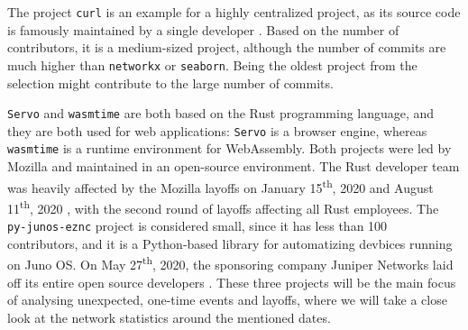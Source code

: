The project \texttt{curl} is an example for a highly centralized project, as its source code is famously maintained by a single developer \cite{crowstonHierarchyCentralizationFree2006}. Based on the number of contributors, it is a medium-sized project, although the number of commits are much higher than \texttt{networkx} or \texttt{seaborn}. Being the oldest project from the selection might contribute to the large number of commits.

\begin{table}
    \centering
        \caption{Collaboration analysis projects and basic statistics.}
        \label{tab:projects}
\end{table}

\texttt{Servo} and \texttt{wasmtime} are both based on the Rust programming language, and they are both used for web applications: \texttt{Servo} is a browser engine, whereas \texttt{wasmtime} is a runtime environment for WebAssembly. Both projects were led by Mozilla and maintained in an open-source environment. The Rust developer team was heavily affected by the Mozilla layoffs on January 15\textsuperscript{th}, 2020 and August 11\textsuperscript{th}, 2020 \cite{lardinoisMozillaLays70,kastrenakesMozillaLaying2502020}, with the second round of layoffs affecting all Rust employees. The \texttt{py-junos-eznc} project is considered small, since it has less than 100 contributors, and it is a Python-based library for automatizing devbices running on Juno OS. On May 27\textsuperscript{th}, 2020, the sponsoring company Juniper Networks laid off its entire open source developers \cite{brasseurFarewellJuniperNetworks2020}. These three projects will be the main focus of analysing unexpected, one-time events and layoffs, where we will take a close look at the network statistics around the mentioned dates.

